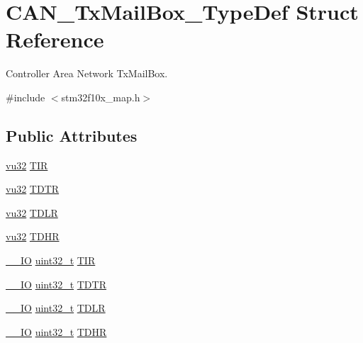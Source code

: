 \hypertarget{struct_c_a_n___tx_mail_box___type_def}{}\section{C\+A\+N\+\_\+\+Tx\+Mail\+Box\+\_\+\+Type\+Def Struct Reference}
\label{struct_c_a_n___tx_mail_box___type_def}


Controller Area Network Tx\+Mail\+Box.  




{\ttfamily \#include $<$stm32f10x\+\_\+map.\+h$>$}

\subsection*{Public Attributes}
\begin{DoxyCompactItemize}
\item 
\hyperlink{agilefox_2library_2inc_2stm32f10x__type_8h_a6e2761f0a1011f84ed96b946f2c8a563}{vu32} \hyperlink{struct_c_a_n___tx_mail_box___type_def_a4fb05cb75703b682f1be00b216a5e466}{T\+IR}
\item 
\hyperlink{agilefox_2library_2inc_2stm32f10x__type_8h_a6e2761f0a1011f84ed96b946f2c8a563}{vu32} \hyperlink{struct_c_a_n___tx_mail_box___type_def_a04274cc74d7f4e83e1775876b321365b}{T\+D\+TR}
\item 
\hyperlink{agilefox_2library_2inc_2stm32f10x__type_8h_a6e2761f0a1011f84ed96b946f2c8a563}{vu32} \hyperlink{struct_c_a_n___tx_mail_box___type_def_a4f48c25398ee52d9f7fe3cf9b6f1f47b}{T\+D\+LR}
\item 
\hyperlink{agilefox_2library_2inc_2stm32f10x__type_8h_a6e2761f0a1011f84ed96b946f2c8a563}{vu32} \hyperlink{struct_c_a_n___tx_mail_box___type_def_ada4a0f2f50aa4b190d74708a65419b7b}{T\+D\+HR}
\item 
\hyperlink{group___c_m_s_i_s___c_m3__core__definitions_gaec43007d9998a0a0e01faede4133d6be}{\+\_\+\+\_\+\+IO} \hyperlink{_p_e___types_8h_a33594304e786b158f3fb30289278f5af}{uint32\+\_\+t} \hyperlink{struct_c_a_n___tx_mail_box___type_def_a22f525c909de2dcec1d4093fe1d562b8}{T\+IR}
\item 
\hyperlink{group___c_m_s_i_s___c_m3__core__definitions_gaec43007d9998a0a0e01faede4133d6be}{\+\_\+\+\_\+\+IO} \hyperlink{_p_e___types_8h_a33594304e786b158f3fb30289278f5af}{uint32\+\_\+t} \hyperlink{struct_c_a_n___tx_mail_box___type_def_a2351cb865d064cf75f61642aaa887f76}{T\+D\+TR}
\item 
\hyperlink{group___c_m_s_i_s___c_m3__core__definitions_gaec43007d9998a0a0e01faede4133d6be}{\+\_\+\+\_\+\+IO} \hyperlink{_p_e___types_8h_a33594304e786b158f3fb30289278f5af}{uint32\+\_\+t} \hyperlink{struct_c_a_n___tx_mail_box___type_def_a408c96501b1cc8bd527432736d132a39}{T\+D\+LR}
\item 
\hyperlink{group___c_m_s_i_s___c_m3__core__definitions_gaec43007d9998a0a0e01faede4133d6be}{\+\_\+\+\_\+\+IO} \hyperlink{_p_e___types_8h_a33594304e786b158f3fb30289278f5af}{uint32\+\_\+t} \hyperlink{struct_c_a_n___tx_mail_box___type_def_a98c6bcd7c9bae378ebf83fd9f5b59020}{T\+D\+HR}
\end{DoxyCompactItemize}


